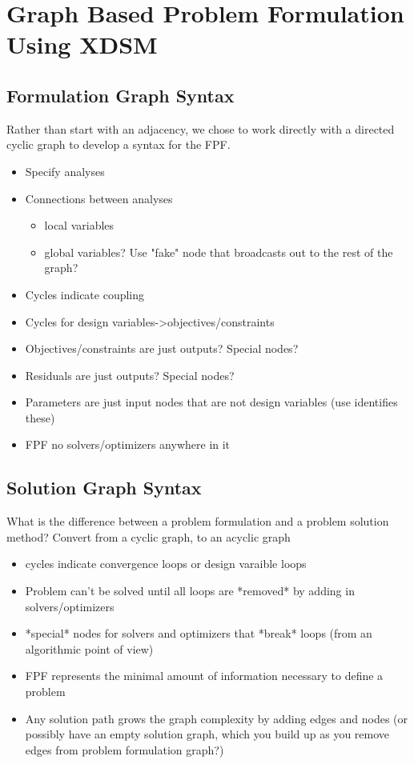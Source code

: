 \documentclass[]{aiaa-tc} %
\begin{document}
    
\section{Graph Based Problem Formulation Using XDSM}
    \subsection{Formulation Graph Syntax}
    Rather than start with an adjacency, we chose to work directly with a directed cyclic graph to develop a syntax for the FPF. 
    \begin{itemize}
        \item Specify analyses
        \item Connections between analyses 
            \begin{itemize}
                \item local variables
                \item global variables? Use "fake" node that broadcasts out to the rest of the graph? 
            \end{itemize}
        \item Cycles indicate coupling
        \item Cycles for design variables->objectives/constraints
        \item Objectives/constraints are just outputs? Special nodes? 
        \item Residuals are just outputs? Special nodes? 
        \item Parameters are just input nodes that are not design variables (use identifies these)
        \item FPF no solvers/optimizers anywhere in it
    \end{itemize}

    \subsection{Solution Graph Syntax}
    What is the difference between a problem formulation and a problem solution method? Convert from a cyclic graph, to an acyclic graph
    \begin{itemize}
        \item cycles indicate convergence loops or design varaible loops
        \item Problem can't be solved until all loops are *removed* by adding in solvers/optimizers
        \item *special* nodes for solvers and optimizers that *break* loops (from an algorithmic point of view)
        \item FPF represents the minimal amount of information necessary to define a problem
        \item Any solution path grows the graph complexity by adding edges and nodes (or possibly have an empty solution graph, which you build up 
        as you remove edges from problem formulation graph?)
    \end{itemize}
\end{document}
